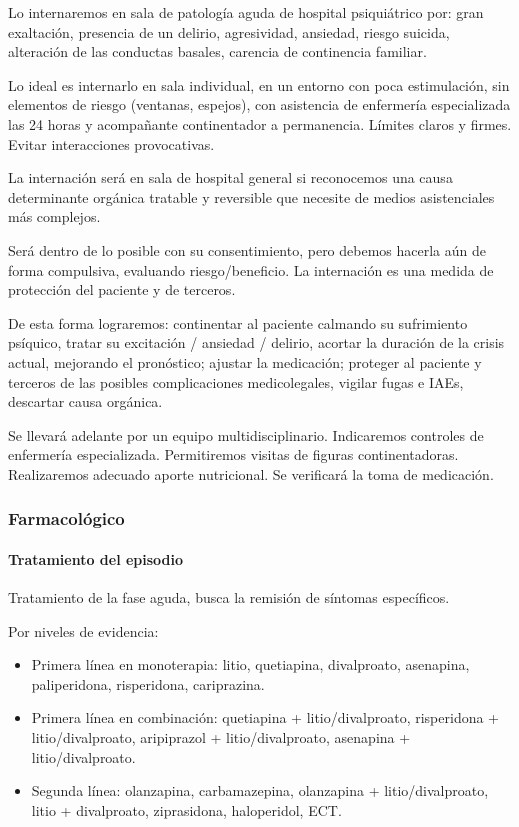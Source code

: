 \documentclass{scrbook}
\begin{document}
Lo internaremos en sala de patología aguda de hospital psiquiátrico por: gran exaltación, presencia de un delirio, agresividad, ansiedad, riesgo suicida, alteración de las conductas basales, carencia de continencia familiar.

Lo ideal es internarlo en sala individual, en un entorno con poca estimulación, sin elementos de riesgo (ventanas, espejos), con asistencia de enfermería especializada las 24 horas y acompañante continentador a permanencia. Límites claros y firmes. Evitar interacciones provocativas.

La internación será en sala de hospital general si reconocemos una causa determinante orgánica tratable y reversible que necesite de medios asistenciales más complejos. 

Será dentro de lo posible con su consentimiento, pero debemos hacerla aún de forma compulsiva, evaluando riesgo/beneficio. La internación es una medida de protección del paciente y de terceros.

De esta forma lograremos: continentar al paciente calmando su sufrimiento psíquico, tratar su excitación / ansiedad / delirio, acortar la duración de la crisis actual, mejorando el pronóstico; ajustar la medicación; proteger al paciente y terceros de las posibles complicaciones medicolegales, vigilar fugas e IAEs, descartar causa orgánica.

Se llevará adelante por un equipo multidisciplinario. Indicaremos controles de enfermería especializada. Permitiremos visitas de figuras continentadoras. Realizaremos adecuado aporte nutricional. Se verificará la toma de medicación.
\subsubsection*{Farmacológico}
\paragraph{Tratamiento del episodio}
Tratamiento de la fase aguda, busca la remisión de síntomas específicos.

Por niveles de evidencia:
\begin{itemize}
	\item Primera línea en monoterapia: litio, quetiapina, divalproato, asenapina, paliperidona, risperidona, cariprazina.
	\item Primera línea en combinación: quetiapina + litio/divalproato, risperidona + litio/divalproato, aripiprazol + litio/divalproato, asenapina + litio/divalproato.
	\item Segunda línea: olanzapina, carbamazepina, olanzapina + litio/divalproato, litio + divalproato, ziprasidona, haloperidol, ECT.
\end{itemize}
\end{document}
